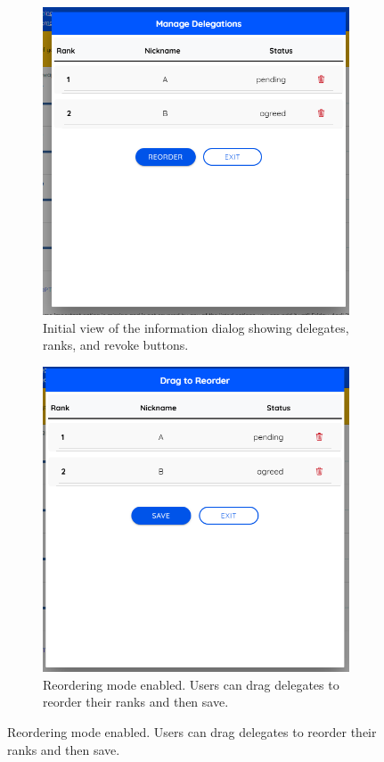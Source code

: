 \begin{figure}[H]
  \centering
  
  \begin{subfigure}[t]{0.45\textwidth}
  \centering
  \includegraphics[width=\linewidth]{../common/vodle_screenshots/ranked_info.png}
  \caption{Initial view of the information dialog showing delegates, ranks, and revoke buttons.}
  \end{subfigure}
  \hfill
  \begin{subfigure}[t]{0.45\textwidth}
  \centering
  \includegraphics[width=\linewidth]{../common/vodle_screenshots/ranked_info_reorder.png}
  \caption{Reordering mode enabled. Users can drag delegates to reorder their ranks and then save.}
  \end{subfigure}
  

\end{figure}
